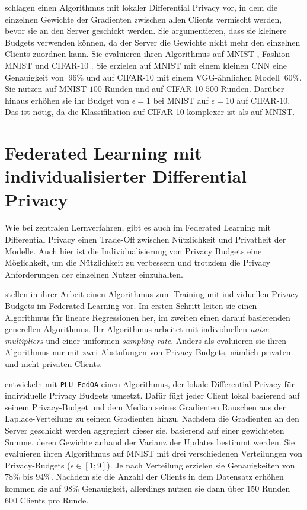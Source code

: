 \textcite{sun:2021} schlagen einen Algorithmus mit lokaler Differential Privacy vor, in dem die einzelnen Gewichte der Gradienten zwischen allen Clients vermischt werden, bevor sie an den Server geschickt werden. Sie argumentieren, dass sie kleinere Budgets verwenden können, da der Server die Gewichte nicht mehr den einzelnen Clients zuordnen kann. Sie evaluieren ihren Algorithmus auf MNIST \cite{lecun:1998}, Fashion-MNIST \cite{xiao:2017} und CIFAR-10 \cite{krizhevsky:2009}. Sie erzielen auf MNIST mit einem kleinen CNN eine Genauigkeit von $~96\%$ und auf CIFAR-10 mit einem VGG-ähnlichen Modell $~60\%$. Sie nutzen auf MNIST $100$ Runden und auf CIFAR-10 $500$ Runden. Darüber hinaus erhöhen sie ihr Budget von $\epsilon = 1$ bei MNIST auf $\epsilon = 10$ auf CIFAR-10. Das ist nötig, da die Klassifikation auf CIFAR-10 komplexer ist als auf MNIST.


\section{Federated Learning mit individualisierter Differential Privacy}\label{sec:rw-flidp}

Wie bei zentralen Lernverfahren, gibt es auch im Federated Learning mit Differential Privacy einen Trade-Off zwischen Nützlichkeit und Privatheit der Modelle. Auch hier ist die Individualisierung von Privacy Budgets eine Möglichkeit, um die Nützlichkeit zu verbessern und trotzdem die Privacy Anforderungen der einzelnen Nutzer einzuhalten.

\textcite{aldaghri:2023} stellen in ihrer Arbeit einen Algorithmus zum Training mit individuellen Privacy Budgets im Federated Learning vor. Im ersten Schritt leiten sie einen Algorithmus für lineare Regressionen her, im zweiten einen darauf basierenden generellen Algorithmus. Ihr Algorithmus arbeitet mit individuellen \textit{noise multipliers} und einer uniformen \textit{sampling rate}. Anders als \citeauthor{boenisch:2023} evaluieren sie ihren Algorithmus nur mit zwei Abstufungen von Privacy Budgets, nämlich privaten und nicht privaten Clients.

\textcite{yang:2021} entwickeln mit \texttt{PLU-FedOA} einen Algorithmus, der lokale Differential Privacy für individuelle Privacy Budgets umsetzt. Dafür fügt jeder Client lokal basierend auf seinem Privacy-Budget und dem Median seines Gradienten Rauschen aus der Laplace-Verteilung zu seinem Gradienten hinzu. Nachdem die Gradienten an den Server geschickt werden aggregiert dieser sie, basierend auf einer gewichteten Summe, deren Gewichte anhand der Varianz der Updates bestimmt werden. Sie evaluieren ihren Algorithmus auf MNIST mit drei verschiedenen Verteilungen von Privacy-Budgets ($\epsilon \in [1;9]$). Je nach Verteilung erzielen sie Genauigkeiten von $78\%$ bis $94\%$. Nachdem sie die Anzahl der Clients in dem Datensatz erhöhen kommen sie auf $98\%$ Genauigkeit, allerdings nutzen sie dann über 150 Runden 600 Clients pro Runde.

